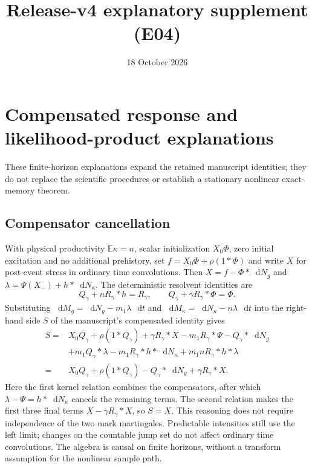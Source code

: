 \documentclass[11pt,a4paper]{article}
\title{Release-v4 explanatory supplement (E04)}
\author{}
\date{18 October 2026}
\newcommand{\E}{\mathbb{E}}
\newcommand{\dif}{\mathop{}\!\mathrm{d}}
\begin{document}
\maketitle
\section{Compensated response and likelihood-product explanations}
\label{sec:vfour_math_explanations}
These finite-horizon explanations expand the retained manuscript identities;
they do not replace the scientific procedures or establish a stationary
nonlinear exact-memory theorem.

\subsection{Compensator cancellation}
With physical productivity $\E \kappa=n$, scalar initialization
$X_0\Phi$, zero initial excitation and no additional prehistory, set
$f=X_0\Phi+\rho(1*\Phi)$ and write $X$ for post-event stress in ordinary
time convolutions. Then $X=f-\Phi*\dif N_g$ and
$\lambda=\Psi(X_-)+h*\dif N_\kappa$.
The deterministic resolvent identities are
\[
Q_\gamma+nR_\gamma*h=R_\gamma,\qquad
Q_\gamma+\gamma R_\gamma*\Phi=\Phi.
\]
Substituting $\dif M_g=\dif N_g-m_1\lambda\,\dif t$
and $\dif M_\kappa=\dif N_\kappa-n\lambda\,\dif t$
into the right-hand side $S$ of the manuscript's compensated identity gives
\[
\begin{aligned}
S={}&X_0Q_\gamma+\rho(1*Q_\gamma)+\gamma R_\gamma*X
-m_1R_\gamma*\Psi-Q_\gamma*\dif N_g\\
&+m_1Q_\gamma*\lambda-m_1R_\gamma*h*\dif N_\kappa
+m_1nR_\gamma*h*\lambda\\
={}&X_0Q_\gamma+\rho(1*Q_\gamma)-Q_\gamma*\dif N_g
+\gamma R_\gamma*X.
\end{aligned}
\]
Here the first kernel relation combines the compensators, after which
$\lambda-\Psi=h*\dif N_\kappa$ cancels the remaining terms.
The second relation makes the first three final terms
$X-\gamma R_\gamma*X$, so $S=X$. This reasoning does not require
independence of the two mark martingales. Predictable intensities still
use the left limit; changes on the countable jump set do not affect
ordinary time convolutions. The algebra is causal on finite horizons,
without a transform assumption for the nonlinear sample path.
\end{document}
